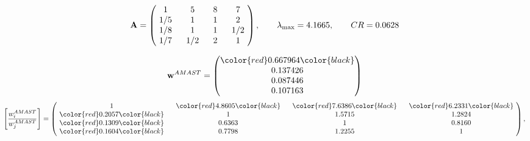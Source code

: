 \begin{example}
\begin{equation*}
\mathbf{A} =
\begin{pmatrix}
$\,\,$ 1 $\,\,$ & $\,\,$5$\,\,$ & $\,\,$8$\,\,$ & $\,\,$7 $\,\,$ \\
$\,\,$ 1/5$\,\,$ & $\,\,$ 1 $\,\,$ & $\,\,$1$\,\,$ & $\,\,$2 $\,\,$ \\
$\,\,$ 1/8$\,\,$ & $\,\,$ 1 $\,\,$ & $\,\,$ 1 $\,\,$ & $\,\,$ 1/2 $\,\,$ \\
$\,\,$ 1/7$\,\,$ & $\,\,$ 1/2$\,\,$ & $\,\,$2$\,\,$ & $\,\,$ 1  $\,\,$ \\
\end{pmatrix},
\qquad
\lambda_{\max} =
4.1665,
\qquad
CR = 0.0628
\end{equation*}

\begin{equation*}
\mathbf{w}^{AMAST} =
\begin{pmatrix}
\color{red} 0.667964\color{black} \\
0.137426\\
0.087446\\
0.107163
\end{pmatrix}\end{equation*}
\begin{equation*}
\left[ \frac{{w}^{AMAST}_i}{{w}^{AMAST}_j} \right] =
\begin{pmatrix}
$\,\,$ 1 $\,\,$ & $\,\,$\color{red} 4.8605\color{black} $\,\,$ & $\,\,$\color{red} 7.6386\color{black} $\,\,$ & $\,\,$\color{red} 6.2331\color{black} $\,\,$ \\
$\,\,$\color{red} 0.2057\color{black} $\,\,$ & $\,\,$ 1 $\,\,$ & $\,\,$1.5715$\,\,$ & $\,\,$1.2824  $\,\,$ \\
$\,\,$\color{red} 0.1309\color{black} $\,\,$ & $\,\,$0.6363$\,\,$ & $\,\,$ 1 $\,\,$ & $\,\,$0.8160 $\,\,$ \\
$\,\,$\color{red} 0.1604\color{black} $\,\,$ & $\,\,$0.7798$\,\,$ & $\,\,$1.2255$\,\,$ & $\,\,$ 1  $\,\,$ \\
\end{pmatrix},
\end{equation*}


\end{example}
